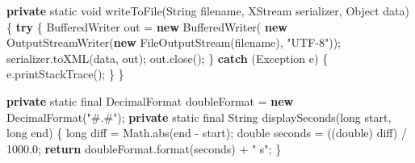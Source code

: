 \documentclass[]{article}
\newenvironment{Shaded}{}{}
\newcommand{\KeywordTok}[1]{\textcolor[rgb]{0.00,0.44,0.13}{\textbf{{#1}}}}
\newcommand{\DataTypeTok}[1]{\textcolor[rgb]{0.56,0.13,0.00}{{#1}}}
\newcommand{\FloatTok}[1]{\textcolor[rgb]{0.25,0.63,0.44}{{#1}}}
\newcommand{\StringTok}[1]{\textcolor[rgb]{0.25,0.44,0.63}{{#1}}}
\newcommand{\FunctionTok}[1]{\textcolor[rgb]{0.02,0.16,0.49}{{#1}}}
\newcommand{\BuiltInTok}[1]{{#1}}
\newcommand{\NormalTok}[1]{{#1}}
\begin{document}
\begin{Shaded}
\begin{Highlighting}[]
	\KeywordTok{private} \DataTypeTok{static} \DataTypeTok{void} \FunctionTok{writeToFile}\NormalTok{(}\BuiltInTok{String} \NormalTok{filename, XStream serializer, }\BuiltInTok{Object} \NormalTok{data) \{}
		\KeywordTok{try} \NormalTok{\{}
			\BuiltInTok{BufferedWriter} \NormalTok{out = }\KeywordTok{new} \BuiltInTok{BufferedWriter}\NormalTok{(}
			  \KeywordTok{new} \BuiltInTok{OutputStreamWriter}\NormalTok{(}\KeywordTok{new} \BuiltInTok{FileOutputStream}\NormalTok{(filename), }\StringTok{"UTF-8"}\NormalTok{));}
			\NormalTok{serializer.}\FunctionTok{toXML}\NormalTok{(data, out);}
			\NormalTok{out.}\FunctionTok{close}\NormalTok{();}
		\NormalTok{\} }\KeywordTok{catch} \NormalTok{(}\BuiltInTok{Exception} \NormalTok{e) \{}
			\NormalTok{e.}\FunctionTok{printStackTrace}\NormalTok{();}
		\NormalTok{\}}
	\NormalTok{\}}
	
	\KeywordTok{private} \DataTypeTok{static} \DataTypeTok{final} \BuiltInTok{DecimalFormat} \NormalTok{doubleFormat = }\KeywordTok{new} \BuiltInTok{DecimalFormat}\NormalTok{(}\StringTok{"#.#"}\NormalTok{);}
	\KeywordTok{private} \DataTypeTok{static} \DataTypeTok{final} \BuiltInTok{String} \FunctionTok{displaySeconds}\NormalTok{(}\DataTypeTok{long} \NormalTok{start, }\DataTypeTok{long} \NormalTok{end) \{}
		\DataTypeTok{long} \NormalTok{diff = }\BuiltInTok{Math}\NormalTok{.}\FunctionTok{abs}\NormalTok{(end - start);}
		\DataTypeTok{double} \NormalTok{seconds = ((}\DataTypeTok{double}\NormalTok{) diff) / }\FloatTok{1000.0}\NormalTok{;}
		\KeywordTok{return} \NormalTok{doubleFormat}\FunctionTok{.format}\NormalTok{(seconds) + }\StringTok{" s"}\NormalTok{;}
	\NormalTok{\}}


\end{Highlighting}
\end{Shaded}
\end{document}
